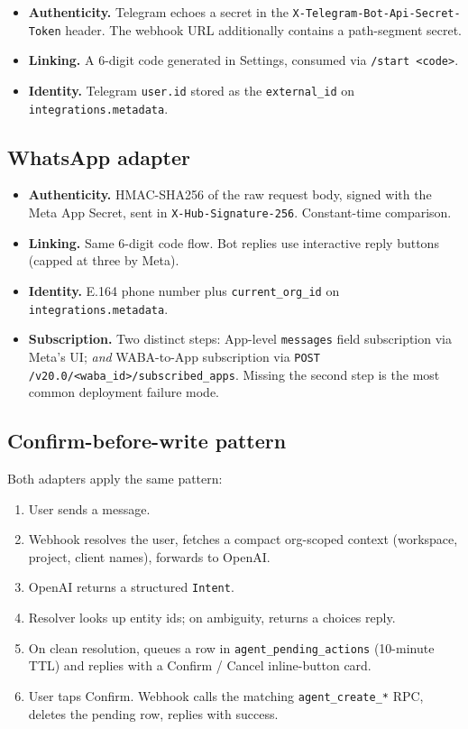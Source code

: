 \documentclass[11pt,a4paper,oneside]{article}
\newcommand{\code}[1]{\texttt{\small #1}}
\begin{document}
\begin{itemize}
  \item \textbf{Authenticity.} Telegram echoes a secret in the
    \code{X-Telegram-Bot-Api-Secret-Token} header. The webhook URL
    additionally contains a path-segment secret.
  \item \textbf{Linking.} A 6-digit code generated in Settings,
    consumed via \code{/start <code>}.
  \item \textbf{Identity.} Telegram \code{user.id} stored as the
    \code{external\_id} on \code{integrations.metadata}.
\end{itemize}

\subsection{WhatsApp adapter}

\begin{itemize}
  \item \textbf{Authenticity.} HMAC-SHA256 of the raw request body,
    signed with the Meta App Secret, sent in
    \code{X-Hub-Signature-256}. Constant-time comparison.
  \item \textbf{Linking.} Same 6-digit code flow. Bot replies use
    interactive reply buttons (capped at three by Meta).
  \item \textbf{Identity.} E.164 phone number plus
    \code{current\_org\_id} on \code{integrations.metadata}.
  \item \textbf{Subscription.} Two distinct steps: App-level
    \code{messages} field subscription via Meta's UI; \emph{and}
    WABA-to-App subscription via
    \code{POST /v20.0/<waba\_id>/subscribed\_apps}. Missing the second
    step is the most common deployment failure mode.
\end{itemize}

\subsection{Confirm-before-write pattern}

Both adapters apply the same pattern:
\begin{enumerate}
  \item User sends a message.
  \item Webhook resolves the user, fetches a compact org-scoped
    context (workspace, project, client names), forwards to OpenAI.
  \item OpenAI returns a structured \code{Intent}.
  \item Resolver looks up entity ids; on ambiguity, returns a choices
    reply.
  \item On clean resolution, queues a row in
    \code{agent\_pending\_actions} (10-minute TTL) and replies with a
    Confirm / Cancel inline-button card.
  \item User taps Confirm. Webhook calls the matching
    \code{agent\_create\_*} RPC, deletes the pending row, replies with
    success.
\end{enumerate}
\end{document}
